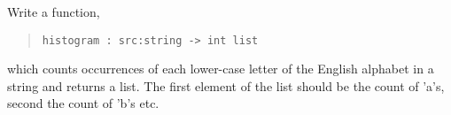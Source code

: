 \label{histogram}
Write a function,
\begin{quote}
  \mbox{\lstinline!histogram : src:string -> int list!}
\end{quote}
which counts occurrences of each lower-case letter of
the English alphabet in a string and returns a list. The first element
of the list should be the count of 'a's, second the count of 'b's
etc. 